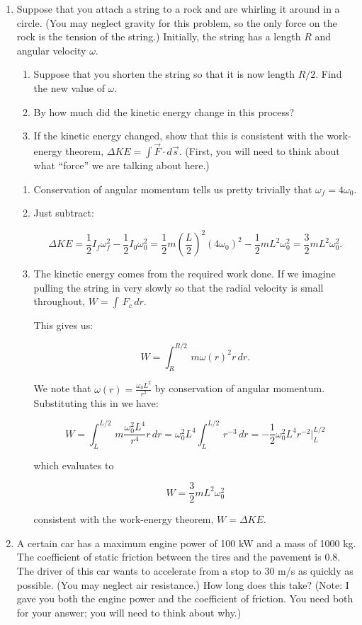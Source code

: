 \documentclass[12pt]{article}
\newcommand{\black}{\color{Black}}
\begin{document}
\begin{enumerate}
\item Suppose that you attach a string to a rock and are whirling it around in a circle. (You may neglect gravity for this problem, so the only force on the rock is the tension of the string.)
Initially, the string has a length $R$ and angular velocity $\omega$.
\begin{enumerate}
\item Suppose that you shorten the string so that it is now length $R/2$. Find the new value of $\omega$.
\item By how much did the kinetic energy change in this process?
\item If the kinetic energy changed, show that this is consistent with the work-energy theorem, $\Delta KE = \int \vec F \cdot d\vec s$. (First, you will need to think about what ``force'' we are talking about here.)
\end{enumerate}

\color{Red}

\begin{enumerate}

\item Conservation of angular momentum tells us pretty trivially that $\omega_f = 4\omega_0$.
\item Just subtract:

$$\Delta KE = \frac{1}{2} I_f \omega_f^2 - \frac{1}{2} I_0 \omega_0^2 = 
\frac{1}{2} m\left(\frac{L}{2}\right)^2 (4 \omega_0)^2 - \frac{1}{2} mL^2 \omega_0^2 = \frac{3}{2} mL^2 \omega_0^2.$$

\item The kinetic energy comes from the required work done. If we imagine pulling the string in very slowly
so that the radial velocity is small throughout, $W = \int\,F_c\,dr$.

This gives us:

$$W = \int_R^{R/2}\,m\omega(r)^2 r\,dr.$$

We note that $\omega(r) = \frac{\omega_0L^2}{r^2}$ by conservation of angular momentum. Substituting this in
we have:

$$W = \int_L^{L/2}\,m\frac{\omega_0^2L^4}{r^4} r\,dr = \omega_0^2L^4 \int_L^{L/2}\,r^{-3}\,dr = 
-\frac{1}{2}\omega_0^2L^4r^{-2}\Big\rvert_L^{L/2}$$

which evaluates to

$$W = \frac{3}{2} mL^2 \omega_0^2$$

consistent with the work-energy theorem, $W = \Delta KE$.

\end{enumerate}
\black
\item A certain car has a maximum engine power of 100 kW and a mass of 1000 kg. The coefficient of static friction between the tires and the pavement is 0.8. The driver of this car wants to accelerate from a stop to 
30 m/s as quickly as possible. (You may neglect air resistance.) How long does this take? (Note: I gave you both the engine power and the coefficient of friction. You need both for your answer; you will need to think about why.)


\end{enumerate}
\end{document}
